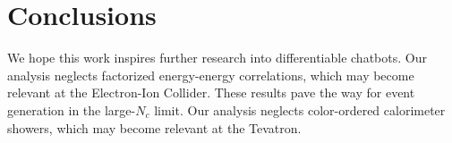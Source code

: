 \section{Conclusions}\label{sec:conclusions}

We hope this work inspires further research into differentiable
chatbots. Our analysis neglects factorized energy-energy correlations,
which may become relevant at the Electron-Ion Collider. These results
pave the way for event generation in the large-$N_c$ limit. Our analysis
neglects color-ordered calorimeter showers, which may become relevant at
the Tevatron.

